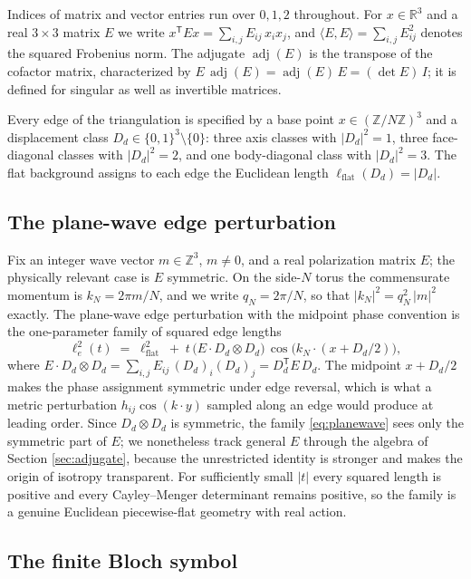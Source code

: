 \documentclass[11pt]{article}
\theoremstyle{definition}
\theoremstyle{remark}
\DeclareMathOperator{\adjE}{adj}
\newcommand{\R}{\mathbb{R}}
\newcommand{\Z}{\mathbb{Z}}
\newcommand{\trans}{\mathsf{T}}
\begin{document}
Indices of matrix and vector entries run over $0,1,2$ throughout. For $x\in\R^3$ and a real $3\times 3$ matrix $E$ we write $x^{\trans} E x = \sum_{i,j} E_{ij}\, x_i x_j$, and $\langle E, E\rangle = \sum_{i,j} E_{ij}^2$ denotes the squared Frobenius norm. The adjugate $\adjE(E)$ is the transpose of the cofactor matrix, characterized by $E\,\adjE(E) = \adjE(E)\,E = (\det E)\,I$; it is defined for singular as well as invertible matrices.

Every edge of the triangulation is specified by a base point $x\in(\Z/N\Z)^3$ and a displacement class $D_d\in\{0,1\}^3\setminus\{0\}$: three axis classes with $|D_d|^2=1$, three face-diagonal classes with $|D_d|^2=2$, and one body-diagonal class with $|D_d|^2=3$. The flat background assigns to each edge the Euclidean length $\ell_{\mathrm{flat}}(D_d)=|D_d|$.

\subsection{The plane-wave edge perturbation}

Fix an integer wave vector $m\in\Z^3$, $m\neq 0$, and a real polarization matrix $E$; the physically relevant case is $E$ symmetric. On the side-$N$ torus the commensurate momentum is $k_N = 2\pi m / N$, and we write $q_N = 2\pi/N$, so that $|k_N|^2 = q_N^2\,|m|^2$ exactly. The plane-wave edge perturbation with the midpoint phase convention is the one-parameter family of squared edge lengths
\begin{equation}
\ell^{2}_{e}(t) \;=\; \ell^{2}_{\mathrm{flat}} \;+\; t\,\bigl(E\cdot D_d\otimes D_d\bigr)\,\cos\!\bigl(k_N\cdot(x + D_d/2)\bigr),
\label{eq:planewave}
\end{equation}
where $E\cdot D_d\otimes D_d = \sum_{i,j} E_{ij}\,(D_d)_i (D_d)_j = D_d^{\trans}E\,D_d$. The midpoint $x + D_d/2$ makes the phase assignment symmetric under edge reversal, which is what a metric perturbation $h_{ij}\cos(k\cdot y)$ sampled along an edge would produce at leading order. Since $D_d\otimes D_d$ is symmetric, the family \eqref{eq:planewave} sees only the symmetric part of $E$; we nonetheless track general $E$ through the algebra of Section \ref{sec:adjugate}, because the unrestricted identity is stronger and makes the origin of isotropy transparent. For sufficiently small $|t|$ every squared length is positive and every Cayley--Menger determinant remains positive, so the family is a genuine Euclidean piecewise-flat geometry with real action.

\subsection{The finite Bloch symbol}
\end{document}
